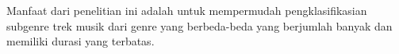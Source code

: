 Manfaat dari penelitian ini adalah untuk mempermudah pengklasifikasian subgenre trek musik dari genre yang berbeda-beda yang berjumlah banyak dan memiliki durasi yang terbatas.



















